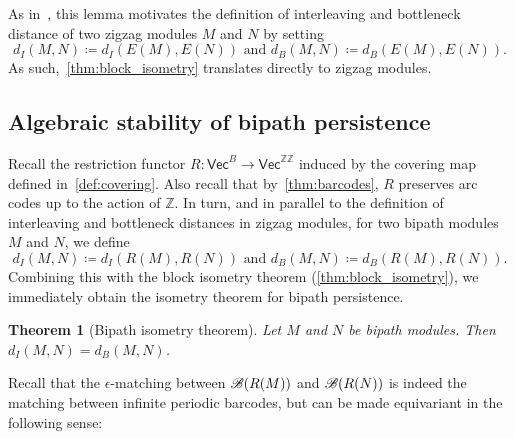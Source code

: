 \documentclass[a4paper,english,reqno]{amsart}
\newcommand\ZZ{\mathbb{ZZ}}
\newcommand\Z{\mathbb{Z}}
\newcommand{\cat}[1]{\ensuremath{\mathsf{#1}}}
\renewcommand{\Vec}{\cat{Vec}}
\theoremstyle{plain}
\newtheorem{theorem}{Theorem}[section]
\theoremstyle{definition} %
\begin{document}
As in~\cite{botnanAlgebraicStabilityZigzag2018,bjerkevikStabilityIntervalDecomposable2021}, this lemma motivates the definition of interleaving and bottleneck distance of two zigzag modules $M$ and $N$ by setting
\begin{equation*}
  d_{I}(M, N) \coloneqq d_{I}(E(M), E(N)) \text{ and } d_{B}(M, N) \coloneqq d_{B}(E(M), E(N)).
\end{equation*}
As such,~\cref{thm:block_isometry} translates directly to zigzag modules.

\subsection{Algebraic stability of bipath persistence} Recall the restriction functor
$R\colon \Vec^{B}\to\Vec^{\ZZ}$ induced by the covering map defined in~\cref{def:covering}. Also recall that by~\cref{thm:barcodes}, $R$ preserves arc codes up to the action of $\Z$. In turn, and in parallel to the definition of interleaving and bottleneck distances in zigzag modules, for two bipath modules $M$ and $N$, we define
\begin{equation*}
  d_{I}(M, N) \coloneqq d_{I}(R(M), R(N)) \text{ and } d_{B}(M, N) \coloneqq d_{B}(R(M), R(N)).
\end{equation*}
Combining this with the block isometry theorem (\cref{thm:block_isometry}), we immediately obtain the isometry theorem for bipath persistence.
\begin{theorem}[Bipath isometry theorem]
Let $M$ and $N$ be bipath modules. Then $d_{I}(M, N) = d_{B}(M, N)$.
\end{theorem}

Recall that the $\epsilon$-matching between $\mathcal{B}(R(M))$ and $\mathcal{B}(R(N))$ is indeed the matching between infinite periodic barcodes, but can be made equivariant in the following sense:
\end{document}

